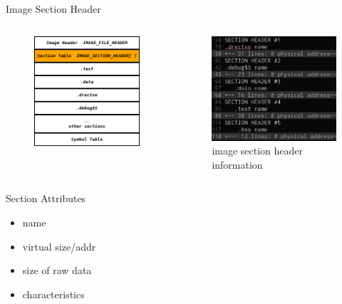 \begin{frame}{Image Section Header}
    \begin{columns}[t]
        \begin{figure}
            \begin{center}
                \includegraphics[width=.5\textwidth]{./image/imagesectionheader.png}
            \end{center}
        \end{figure}
        \begin{figure}
            \begin{center}
                \includegraphics[width=.75\textwidth]{./image/imgsechdr.png}
                \caption{image section header information}
            \end{center}
        \end{figure}
    \end{columns}
\end{frame}

\begin{frame}[t]{Section Attributes}
    \begin{itemize}
        \item name
        \item virtual size/addr
        \item size of raw data
        \item characteristics
    \end{itemize}
\end{frame}


